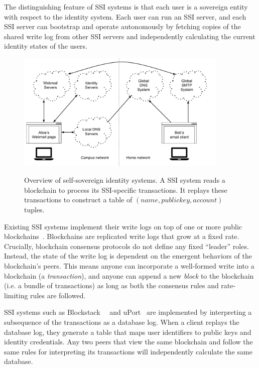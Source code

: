 The distinguishing feature of SSI systems is that each user is a sovereign
entity with respect to the identity system.  Each user can run an SSI server,
and each SSI server can bootstrap and operate autonomously by fetching copies
of the shared write log from other SSI servers and independently
calculating the current identity states of the users.

\begin{figure}[h]
   \caption{Overview of self-sovereign identity systems.  A SSI system reads a
   blockchain to process its SSI-specific transactions.  It replays these
   transactions to construct a table of $(name, public key, account)$ tuples.}
   \centering
   \includegraphics[width=0.9\textwidth,page=14]{figures/dissertation-figures}
   \label{fig:chap2-ssi-system}
\end{figure}

Existing SSI systems implement their write logs on top of one or more public
blockchains~\cite{bitcoin}.  Blockchains are replicated write logs that
grow at a fixed rate.  Crucially, blockchain consensus protocols do not 
define any fixed ``leader'' roles.  Instead, the state of the write log is dependent on the emergent behaviors
of the blockchain's peers.  This means anyone can incorporate a well-formed write into a blockchain
(a \emph{transaction}), and anyone can append a new \emph{block} to the
blockchain (i.e. a bundle of transactions)
as long as both the consensus rules and rate-limiting rules are followed.

SSI systems such as Blockstack~\cite{blockstack}~\cite{blockstack-thesis} and
uPort~\cite{uport} are implemented by interpreting a subsequence of the
transactions as a database log.  When a client replays the database log, they
generate a table that maps user identifiers to public keys and identity
credentials.  Any two peers that view the same blockchain and follow the
same rules for interpreting its transactions will independently
calculate the same database.

